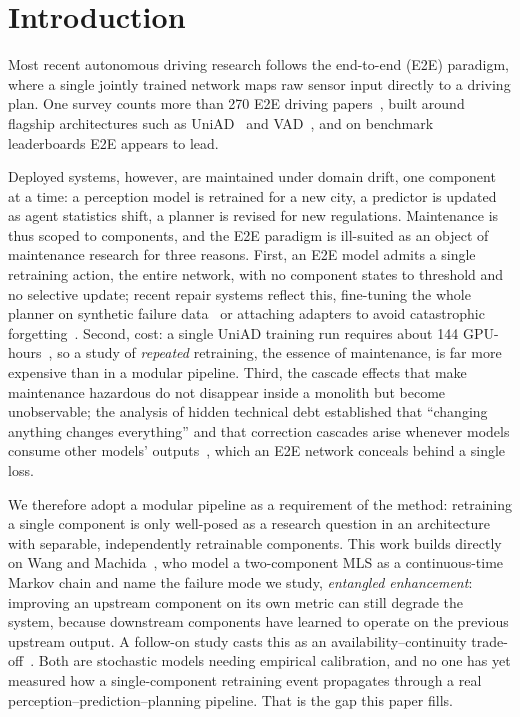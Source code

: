 \documentclass[conference]{IEEEtran}
\begin{document}
\section{Introduction}
Most recent autonomous driving research follows the end-to-end (E2E) paradigm,
where a single jointly trained network maps raw sensor input directly to a
driving plan. One survey counts more than 270 E2E driving
papers~\cite{chen2024e2esurvey}, built around flagship architectures such as
UniAD~\cite{hu2023uniad} and VAD~\cite{jiang2023vad}, and on benchmark
leaderboards E2E appears to lead.

Deployed systems, however, are maintained under domain drift, one component at
a time: a perception model is retrained for a new city, a predictor is updated
as agent statistics shift, a planner is revised for new regulations.
Maintenance is thus scoped to components, and the E2E paradigm is ill-suited as
an object of maintenance research for three reasons. First, an E2E model admits
a single retraining action, the entire network, with no component states to
threshold and no selective update; recent repair systems reflect this,
fine-tuning the whole planner on synthetic failure data~\cite{ma2025correctad}
or attaching adapters to avoid catastrophic forgetting~\cite{liu2025r2se}.
Second, cost: a single UniAD training run requires about 144
GPU-hours~\cite{sun2024sparsedrive}, so a study of \emph{repeated} retraining,
the essence of maintenance, is far more expensive than in a modular pipeline.
Third, the cascade effects that make maintenance hazardous do not disappear
inside a monolith but become unobservable; the analysis of hidden technical
debt established that ``changing anything changes everything'' and that
correction cascades arise whenever models consume other models'
outputs~\cite{sculley2015hidden}, which an E2E network conceals behind a single
loss.

We therefore adopt a modular pipeline as a requirement of the method:
retraining a single component is only well-posed as a research question in an
architecture with separable, independently retrainable components. This work
builds directly on Wang and Machida~\cite{wang2024compsac}, who model a
two-component MLS as a continuous-time Markov chain and name the failure mode
we study, \emph{entangled enhancement}: improving an upstream component on its
own metric can still degrade the system, because downstream components have
learned to operate on the previous upstream output. A follow-on study casts
this as an availability--continuity trade-off~\cite{wang2025issre}. Both are
stochastic models needing empirical calibration, and no one has yet measured
how a single-component retraining event propagates through a real
perception--prediction--planning pipeline. That is the gap this paper fills.
\end{document}
